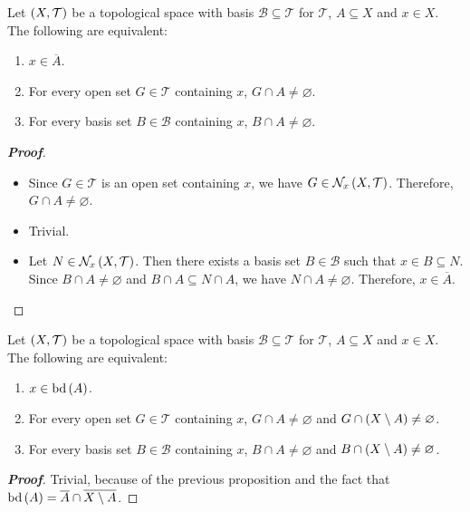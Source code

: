 \begin{proposition}\label{Equivalent definitions for the closure of a set}
  Let $\left(X,\mathcal{T}\right)$ be a topological space with basis $\mathcal{B}\subseteq\mathcal{T}$ for $\mathcal{T}$, $A\subseteq X$ and $x\in X$. The following are equivalent:

  \begin{enumerate}
    \item $x\in\overline{A}$.
    \item For every open set $G\in\mathcal{T}$ containing $x$, $G\cap A\neq\varnothing$.
    \item For every basis set $B\in\mathcal{B}$ containing $x$, $B\cap A\neq\varnothing$.
  \end{enumerate}
  \begin{proof}[\rm\textbf{Proof}]
    \hfill
    \begin{itemize}
      \item[\boxed{1\Rightarrow2}] Since $G\in\mathcal{T}$ is an open set containing $x$, we have $G\in\mathcal{N}_x\left(X,\mathcal{T}\right)$. Therefore, $G\cap A\neq\varnothing$.
      \item[\boxed{2\Rightarrow3}] Trivial.
      \item[\boxed{3\Rightarrow1}] Let $N\in\mathcal{N}_x\left(X,\mathcal{T}\right)$. Then there exists a basis set $B\in\mathcal{B}$ such that $x\in B\subseteq N$. Since $B\cap A\neq\varnothing$ and $B\cap A\subseteq N\cap A$, we have $N\cap A\neq\varnothing$. Therefore, $x\in\overline{A}$.
    \end{itemize}
  \end{proof}
\end{proposition}

\begin{corollary}
  Let $\left(X,\mathcal{T}\right)$ be a topological space with basis $\mathcal{B}\subseteq\mathcal{T}$ for $\mathcal{T}$, $A\subseteq X$ and $x\in X$. The following are equivalent:

  \begin{enumerate}
    \item $x\in\operatorname{bd}\left(A\right)$.
    \item For every open set $G\in\mathcal{T}$ containing $x$, $G\cap A\neq\varnothing$ and $G\cap\left(X\setminus A\right)\neq\varnothing$.
    \item For every basis set $B\in\mathcal{B}$ containing $x$, $B\cap A\neq\varnothing$ and $B\cap\left(X\setminus A\right)\neq\varnothing$.
  \end{enumerate}
  \begin{proof}[\rm\textbf{Proof}]
    \rm Trivial, because of the previous proposition and the fact that $\operatorname{bd}\left(A\right)=\overline{A}\cap\overline{X\setminus A}$.
  \end{proof}
\end{corollary}

